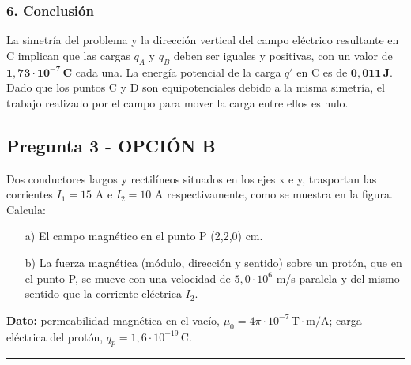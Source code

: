 \subsubsection*{6. Conclusión}
\begin{cajaconclusion}
    La simetría del problema y la dirección vertical del campo eléctrico resultante en C implican que las cargas $q_A$ y $q_B$ deben ser iguales y positivas, con un valor de $\mathbf{1,73 \cdot 10^{-7} \, C}$ cada una. La energía potencial de la carga $q'$ en C es de $\mathbf{0,011 \, J}$. Dado que los puntos C y D son equipotenciales debido a la misma simetría, el trabajo realizado por el campo para mover la carga entre ellos es nulo.
\end{cajaconclusion}

\newpage

\subsection{Pregunta 3 - OPCIÓN B}
\label{subsec:3B_2025_jul_ord}

\begin{cajaenunciado}
Dos conductores largos y rectilíneos situados en los ejes x e y, trasportan las corrientes $I_1=15$ A e $I_2=10$ A respectivamente, como se muestra en la figura. Calcula:
\begin{enumerate}
    \item[a)] El campo magnético en el punto P (2,2,0) cm.
    \item[b)] La fuerza magnética (módulo, dirección y sentido) sobre un protón, que en el punto P, se mueve con una velocidad de $5,0\cdot10^{6}$ m/s paralela y del mismo sentido que la corriente eléctrica $I_2$.
\end{enumerate}
\textbf{Dato:} permeabilidad magnética en el vacío, $\mu_{0}=4\pi\cdot10^{-7}\,\text{T}\cdot\text{m/A}$; carga eléctrica del protón, $q_p=1,6\cdot10^{-19}\,\text{C}$.
\end{cajaenunciado}
\hrule

